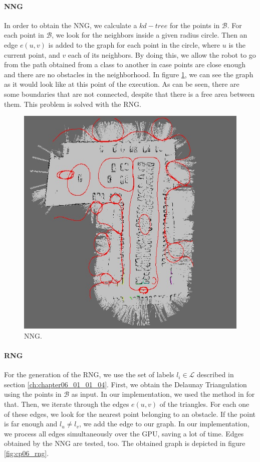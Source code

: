 \paragraph{\acf{NNG}}\label{ch:chapter06_01_01_05_01}

In order to obtain the \ac{NNG}, we calculate a $kd-tree$ for the points in $\mathcal{B}$. For each point in $\mathcal{B}$, we look for the neighbors inside a given radius circle. Then an edge $e(u,v)$ is added to the graph for each point in the circle, where $u$ is the current point, and $v$ each of its neighbors. By doing this, we allow the robot to go from the path obtained from a class to another in case points are close enough and there are no obstacles in the neighborhood. In figure \ref{fig:cp06_nng}, we can see the graph as it would look like at this point of the execution. As can be seen, there are some boundaries that are not connected, despite that there is a free area between them. This problem is solved with the \acf{RNG}.

\begin{figure}[h!]
  \centering
  \includegraphics[width=\textwidth, height=0.75\textwidth]{figure3}
  \caption{\acf{NNG}.}
  \label{fig:cp06_nng}
\end{figure}

\paragraph{\acf{RNG}}\label{ch:chapter06_01_01_05_02}

For the generation of the \ac{RNG}, we use the set of labels $l_i \in \mathcal{L}$ described in section \ref{ch:chapter06_01_01_04}. First, we obtain the Delaunay Triangulation \citep{su1997comparison} using the points in $\mathcal{B}$ as input. In our implementation, we used the method in \cite{rong2008computing} for that. Then, we iterate through the edges $e(u,v)$ of the triangles. For each one of these edges, we look for the nearest point belonging to an obstacle. If the point is far enough and $l_u \neq l_v$, we add the edge to our graph. In our implementation, we process all edges simultaneously over the \acs{GPU}, saving a lot of time. Edges obtained by the \ac{NNG} are tested, too. The obtained graph is depicted in figure \ref{fig:cp06_rng}.

